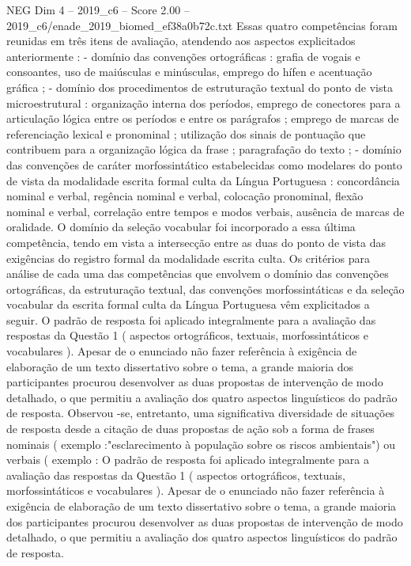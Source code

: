 \begin{textsample}{NEG Dim 4 – 2019\_c6 – Score 2.00 – 2019\_c6/enade\_2019\_biomed\_ef38a0b72c.txt}
Essas quatro competências foram reunidas em três itens de avaliação, atendendo aos aspectos explicitados anteriormente : - domínio das convenções ortográficas : grafia de vogais e consoantes, uso de maiúsculas e minúsculas, emprego do hífen e acentuação gráfica ; - domínio dos procedimentos de estruturação textual do ponto de vista microestrutural : organização interna dos períodos, emprego de conectores para a articulação lógica entre os períodos e entre os parágrafos ; emprego de marcas de referenciação lexical e pronominal ; utilização dos sinais de pontuação que contribuem para a organização lógica da frase ; paragrafação do texto ; - domínio das convenções de caráter morfossintático estabelecidas como modelares do ponto de vista da modalidade escrita formal culta da Língua Portuguesa : concordância nominal e verbal, regência nominal e verbal, colocação pronominal, flexão nominal e verbal, correlação entre tempos e modos verbais, ausência de marcas de oralidade.
O domínio da seleção vocabular foi incorporado a essa última competência, tendo em vista a intersecção entre as duas do ponto de vista das exigências do registro formal da modalidade escrita culta.
Os critérios para análise de cada uma das competências que envolvem o domínio das convenções ortográficas, da estruturação textual, das convenções morfossintáticas e da seleção vocabular da escrita formal culta da Língua Portuguesa vêm explicitados a seguir.
O padrão de resposta foi aplicado integralmente para a avaliação das respostas da Questão 1 ( aspectos ortográficos, textuais, morfossintáticos e vocabulares ).
Apesar de o enunciado não fazer referência à exigência de elaboração de um texto dissertativo sobre o tema, a grande maioria dos participantes procurou desenvolver as duas propostas de intervenção de modo detalhado, o que permitiu a avaliação dos quatro aspectos linguísticos do padrão de resposta.
Observou -se, entretanto, uma significativa diversidade de situações de resposta desde a citação de duas propostas de ação sob a forma de frases nominais ( exemplo :"esclarecimento à população sobre os riscos ambientais") ou verbais ( exemplo : O padrão de resposta foi aplicado integralmente para a avaliação das respostas da Questão 1 ( aspectos ortográficos, textuais, morfossintáticos e vocabulares ).
Apesar de o enunciado não fazer referência à exigência de elaboração de um texto dissertativo sobre o tema, a grande maioria dos participantes procurou desenvolver as duas propostas de intervenção de modo detalhado, o que permitiu a avaliação dos quatro aspectos linguísticos do padrão de resposta.

\end{textsample}
